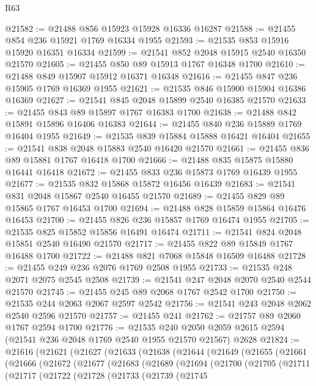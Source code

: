 \begin{lexlean}{R63}
\begin{coremodule}
@21582 := @21488 @856 @15923 @15928 @16336 @16287
@21588 := @21455 @854 @236 @15921 @1769 @16334 @1955
@21593 := @21535 @853 @15916 @15920 @16351 @16334
@21599 := @21541 @852 @2048 @15915 @2540 @16350 @21570
@21605 := @21455 @850 @89 @15913 @1767 @16348 @1700
@21610 := @21488 @849 @15907 @15912 @16371 @16348
@21616 := @21455 @847 @236 @15905 @1769 @16369 @1955
@21621 := @21535 @846 @15900 @15904 @16386 @16369
@21627 := @21541 @845 @2048 @15899 @2540 @16385 @21570
@21633 := @21455 @843 @89 @15897 @1767 @16383 @1700
@21638 := @21488 @842 @15891 @15896 @16406 @16383
@21644 := @21455 @840 @236 @15889 @1769 @16404 @1955
@21649 := @21535 @839 @15884 @15888 @16421 @16404
@21655 := @21541 @838 @2048 @15883 @2540 @16420 @21570
@21661 := @21455 @836 @89 @15881 @1767 @16418 @1700
@21666 := @21488 @835 @15875 @15880 @16441 @16418
@21672 := @21455 @833 @236 @15873 @1769 @16439 @1955
@21677 := @21535 @832 @15868 @15872 @16456 @16439
@21683 := @21541 @831 @2048 @15867 @2540 @16455 @21570
@21689 := @21455 @829 @89 @15865 @1767 @16453 @1700
@21694 := @21488 @828 @15859 @15864 @16476 @16453
@21700 := @21455 @826 @236 @15857 @1769 @16474 @1955
@21705 := @21535 @825 @15852 @15856 @16491 @16474
@21711 := @21541 @824 @2048 @15851 @2540 @16490 @21570
@21717 := @21455 @822 @89 @15849 @1767 @16488 @1700
@21722 := @21488 @821 @7068 @15848 @16509 @16488
@21728 := @21455 @249 @236 @2076 @1769 @2508 @1955
@21733 := @21535 @248 @2071 @2075 @2545 @2508
@21739 := @21541 @247 @2048 @2070 @2540 @2544 @21570
@21745 := @21455 @245 @89 @2068 @1767 @2542 @1700
@21750 := @21535 @244 @2063 @2067 @2597 @2542
@21756 := @21541 @243 @2048 @2062 @2540 @2596 @21570
@21757 := @21455 @241
@21762 := @21757 @89 @2060 @1767 @2594 @1700
@21776 := @21535
    @240
    @2050
    @2059
    @2615
    @2594
    (@21541 @236 @2048 @1769 @2540 @1955 @21570 @21567)
    @2628
@21824 := @21616
    (@21621
      (@21627
        (@21633
          (@21638
            (@21644
              (@21649
                (@21655
                  (@21661
                    (@21666
                      (@21672
                        (@21677
                          (@21683
                            (@21689
                              (@21694
                                (@21700
                                  (@21705
                                    (@21711
                                      (@21717
                                        (@21722
                                          (@21728
                                            (@21733
                                              (@21739
                                                (@21745

\end{coremodule}
\end{lexlean}
